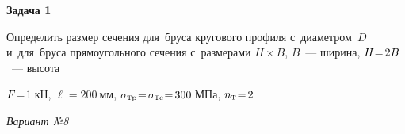 \documentclass[14pt]{extarticle}
\begin{document}
\newpage

\begin{center}

\textbf{Задача 1\raisebox{.7ex}{\small я}}
\vspace{.4cm}

Определить размер сечения для~бруса кругового профиля с~диаметром~$D$
и~для~бруса прямоугольного сечения с~размерами ${H \!\times\! B}$\hbox{,\hspace{.2ex}} $B$~--- ширина\hbox{,\hspace{.2ex}} ${H \hspace{-.5ex}=\hspace{-.3ex} 2B}$~--- высота
\vspace{.4cm}

${F \hspace{-.5ex}=\hspace{-.4ex} 1\:}$кН\hbox{,\hspace{.5ex}}
${\ell \!=\! 200\:}$мм\hbox{,\hspace{.5ex}}
${\sigma_{\mathrm{\scalebox{.6}{T}p}} \hspace{-.5ex}=\hspace{-.3ex} \sigma_{\mathrm{\scalebox{.6}{T}c}} \hspace{-.5ex}=\hspace{-.3ex} 300\:}$МПа\hbox{,\hspace{.5ex}}
${n_{\mathrm{\scalebox{.6}{T}}} \hspace{-.44ex}=\hspace{-.33ex} 2}$
\vspace{1cm}

\emph{Вариант №\hspace{.33ex}8}
\vspace{.8cm}

\end{center}

\newpage
\end{document}
